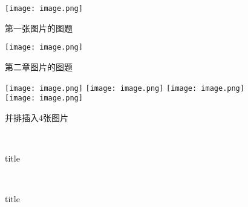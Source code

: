 \documentclass[onecolumn]{article} %
\begin{document}
\begin{figure}[htbp]
    \begin{minipage}[t]{0.45\linewidth}
        \centering
        \texttt{[image: image.png]}
        \caption{第一张图片的图题}
    \end{minipage}
    \begin{minipage}[t]{0.45\linewidth}        %
        \hspace{10pt}
        \texttt{[image: image.png]}
        \caption{第二章图片的图题}
    \end{minipage}
\end{figure}

\begin{figure}[htbp]
    \centering
    {\texttt{[image: image.png]}}
    \hspace{10pt}    %
    {\texttt{[image: image.png]}}
    \hspace{10pt}
    {\texttt{[image: image.png]}}
    \hspace{10pt}
    {\texttt{[image: image.png]}}
    \hspace{10pt}
    \caption{并排插入4张图片}
\end{figure}
    
\begin{figure}[htbp]
    \centering
    \\
    \caption{title}
    \label{fig_6}
\end{figure}

\begin{figure}[htbp]
    \centering
    \\
    \caption{title}
    \label{fig_7}
\end{figure}
\end{document}

